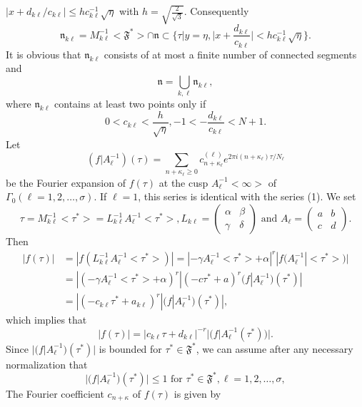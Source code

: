 $|x+d_{k\ell}/c_{k\ell}|\leq hc^{-1}_{k\ell}\sqrt{\eta}$ with
$h=\sqrt{\frac{2}{\sqrt{3}}}$. Consequently
$$
\mathfrak{n}_{k\ell} = M^{-1}_{k\ell} <\mathfrak{F}^{\ast}> \cap
  \mathfrak{n} \subset\{\tau | y = \eta,
  |x+\frac{d_{k\ell}}{c_{k\ell}}|< h c^{-1}_{k\ell} \sqrt{\eta}\}.
$$
It is obvious that $\mathfrak{n}_{k\ell}$ consists of at most a finite
number of connected segments and 
$$
\mathfrak{n} = \bigcup_{k,\ell} \mathfrak{n}_{k\ell}, 
$$
where $\mathfrak{n}_{k\ell}$ contains at least two points only if 
$$
0 < c_{k\ell} < \frac{h}{\sqrt{\eta}}, -1 < -
\frac{d_{k\ell}}{c_{k\ell}} < N +1.
$$
Let 
$$
(f|A^{-1}_{\ell}) (\tau) = \sum_{n+\kappa_{\ell} \geq 0}
c^{(\ell)}_{n+\kappa_{\ell}} e^{2\pi i(n+\kappa_{\ell})\tau/N_{\ell}}
$$
be the Fourier expansion of $f(\tau)$ at the cusp
$A^{-1}_{\ell}<\infty>$ of $\Gamma_0(\ell=1,2,\ldots, \sigma)$. If
$\ell=1$, this series is identical with the series (1). We set 
$$
\tau = M^{-1}_{k\ell}<\tau^{\ast}> = L^{-1}_{k\ell} A^{-1}_{\ell}
<\tau^{\ast}>, L_{k\ell} =\begin{pmatrix}
\alpha & \beta\\
\gamma & \delta\end{pmatrix} \text{ and } A_{\ell} =\begin{pmatrix}
a&b\\c&d
\end{pmatrix}.
$$
Then
\begin{align*}
|f(\tau)| & = |f(L^{-1}_{k\ell} A^{-1}_{\ell}<\tau^{\ast}>)| =
|-\gamma A^{-1}_{\ell} <\tau^{\ast}>+\alpha|^r |f(A^{-1}_{\ell}
|<\tau^{\ast}>)|\\
& = |(-\gamma A^{-1}_{\ell} <\tau^{\ast}>+\alpha)^r
|(-c\tau^{\ast}+a)^r (f|A^{-1}_{\ell})(\tau^{\ast})|\\
& = |(-c_{k\ell} \tau^{\ast} + a_{k\ell})^r
|(f|A^{-1}_{\ell})(\tau^{\ast})|, 
\end{align*}
which \pageoriginale implies that
\begin{equation*}
|f(\tau)| = |c_{k\ell} \tau+d_{k\ell}|^{-r}
|(f|A^{-1}_{\ell}(\tau^{\ast}))|. \tag{7}\label{c3:eq4:7}
\end{equation*}
Since $|(f|A^{-1}_{\ell})(\tau^{\ast})|$ is bounded for
$\tau^{\ast}\in \mathfrak{F}^{\ast}$, we can assume after any
necessary normalization that 
\begin{equation*}
|(f|A^{-1}_{\ell})(\tau^{\ast})| \leq 1 \text{ for } \tau^{\ast}
\in \mathfrak{F}^{\ast}, \ell = 
1, 2, \ldots, \sigma, \tag{8}\label{c3:eq4:8}
\end{equation*}
The Fourier coefficient $c_{n+\kappa}$ of $f(\tau)$ is given by
